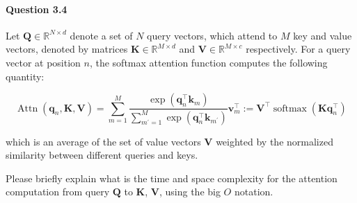 \documentclass[10pt]{article}
\begin{document}
\newpage
\paragraph{Question 3.4} Let $\mathbf{Q} \in \mathbb{R}^{N \times d}$ denote a set of $N$ query vectors, which attend to $M$ key and value vectors, denoted by matrices $\mathbf{K} \in \mathbb{R}^{M \times d}$ and $\mathbf{V} \in \mathbb{R}^{M \times c}$ respectively. For a query vector at position $n$, the softmax attention function computes the following quantity:

$$
  \operatorname{Attn}\left(\mathbf{q}_{n}, \mathbf{K}, \mathbf{V}\right)=\sum_{m=1}^{M} \frac{\exp \left(\mathbf{q}_{n}^{\top} \mathbf{k}_{m}\right)}{\sum_{m^{\prime}=1}^{M} \exp \left(\mathbf{q}_{n}^{\top} \mathbf{k}_{m^{\prime}}\right)} \mathbf{v}_{m}^{\top}:=\mathbf{V}^{\top} \operatorname{softmax}\left(\mathbf{K} \mathbf{q}_{n}^{\top}\right)
$$

which is an average of the set of value vectors $\mathbf{V}$ weighted by the normalized similarity between different queries and keys.

Please briefly explain what is the time and space complexity for the attention computation from query $\mathbf{Q}$ to $\mathbf{K}$, $\mathbf{V}$, using the big $O$ notation.
\end{document}
